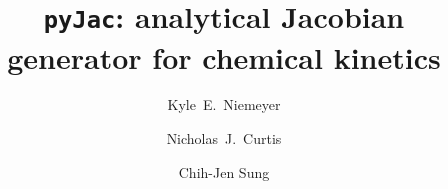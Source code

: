 \documentclass[preprint,12pt]{elsarticle}
\begin{document}
\begin{frontmatter}

\title{\texttt{pyJac}: analytical Jacobian generator for chemical kinetics}

\author[osu]{Kyle~E.\ Niemeyer}

\author[uconn]{Nicholas~J.\ Curtis}
\author[uconn]{Chih-Jen Sung}

\address[osu]{School of Mechanical, Industrial, and Manufacturing Engineering\\
  Oregon State University, Corvallis, OR 97331, USA}
\address[uconn]{Department of Mechanical Engineering\\
  University of Connecticut, Storrs, CT, 06269, USA}




\end{frontmatter}
\end{document}
